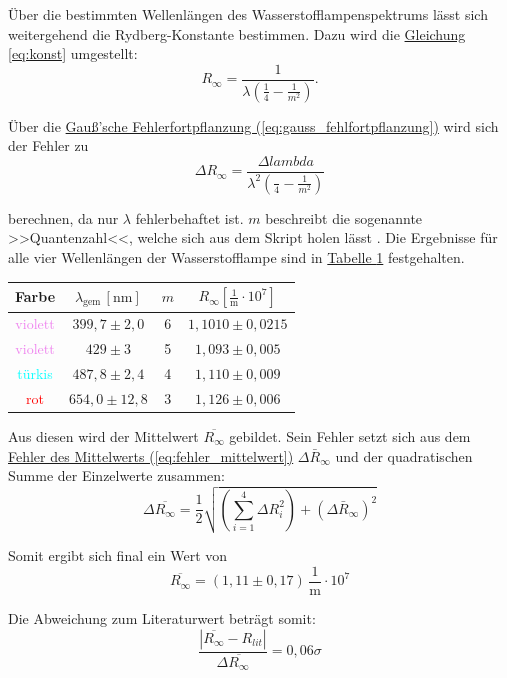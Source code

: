 Über die bestimmten Wellenlängen des Wasserstofflampenspektrums lässt sich weitergehend die Rydberg-Konstante bestimmen. Dazu wird die \hyperref[eq:konst]{Gleichung \ref*{eq:konst}} umgestellt:
\begin{equation}
    R_\infty = \frac{1}{\lambda \left(\frac{1}{4} - \frac{1}{m^2}\right)}.
\end{equation}

Über die \hyperref[eq:gauss_fehlfortpflanzung]{Gauß'sche Fehlerfortpflanzung (\ref*{eq:gauss_fehlfortpflanzung})} wird sich der Fehler zu
\begin{equation}
    \Delta R_\infty = \frac{\Delta lambda}{\lambda^2 \left(\frac{}{4} - \frac{1}{m^2}\right)}
\end{equation}

berechnen, da nur $\lambda$ fehlerbehaftet ist. $m$ beschreibt die sogenannte >>Quantenzahl<<, welche sich aus dem Skript holen lässt \cite{skript25}. Die Ergebnisse für alle vier Wellenlängen der Wasserstofflampe sind in \hyperref[tab:r_werte]{Tabelle \ref*{tab:r_werte}} festgehalten.
\begin{table}
    \centering
    \begin{tabular}{c c  c c}
        \hline
        \textbf{Farbe} & \(\lambda_{\text{gem}}\,[\text{nm}]\) & $m$ & $R_\infty [\mathrm{\frac{1}{m} \cdot 10^7}]$ \\
        \hline
        \textcolor{violet}{violett} & \(399,7 \pm 2,0\) & 6 & $1,1010 \pm 0,0215$\\
        \textcolor{violet}{violett} &\(429 \pm 3\) & 5 & $1,093 \pm 0,005$ \\
        \textcolor{cyan}{türkis} & \(487,8 \pm 2,4\) & 4 & $1,110 \pm 0,009$ \\
        \textcolor{red}{rot} & \(654,0 \pm 12,8\) & 3 & $1,126 \pm 0,006$ \\
        \hline
    \end{tabular}
    \label{tab:r_werte}
\end{table}

Aus diesen wird der Mittelwert $\overline{R_\infty}$ gebildet. Sein Fehler setzt sich aus dem \hyperref[eq:fehler_mittelwert]{Fehler des Mittelwerts (\ref*{eq:fehler_mittelwert})} $\Delta \bar R_\infty$ und der quadratischen Summe der Einzelwerte zusammen:
\begin{equation}
    \Delta \overline{R_\infty} = \frac{1}{2} \sqrt{\left(\sum_{i=1}^{4} \Delta R_i^2\right) + \left(\Delta \bar R_\infty\right)^2}
\end{equation}

Somit ergibt sich final ein Wert von
\begin{equation}
\boxed{
    \overline{R_\infty} = (1,11 \pm 0,17) \, \mathrm{\frac{1}{m} \cdot 10^7}
}
\end{equation}

Die Abweichung zum Literaturwert beträgt somit:
\begin{equation}
    \frac{\left| \overline{R_\infty} - R_{lit} \right|}{\Delta \overline{R_\infty}} = 0,06 \sigma
\end{equation}  
